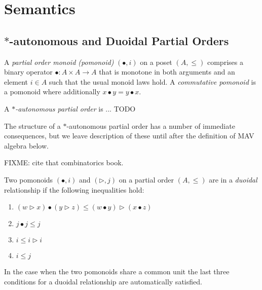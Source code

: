 \section{Semantics}\label{sec:mav-semantics}

\subsection{$*$-autonomous and Duoidal Partial Orders}

\begin{definition}
  A \emph{partial order monoid (pomonoid)} $(\bullet, i)$ on a poset
  $(A, \leq)$ comprises a binary operator $\bullet : A \times A \to A$
  that is monotone in both arguments and an element $i \in A$ such
  that the usual monoid laws hold. A \emph{commutative pomonoid} is a
  pomonoid where additionally $x \bullet y = y \bullet x$.
\end{definition}

\begin{definition}
  A \emph{$*$-autonomous partial order} is ... TODO

  
\end{definition}

\begin{remark}
  The structure of a $*$-autonomous partial order has a number of
  immediate consequences, but we leave description of these until
  after the definition of MAV algebra below. 
\end{remark}

FIXME: cite that combinatorics book.
\begin{definition}
  Two pomonoids $(\bullet, i)$ and $(\rhd, j)$ on a partial order
  $(A, \leq)$ are in a \emph{duoidal} relationship if the following
  inequalities hold:
  \begin{enumerate}
  \item $(w \rhd x) \bullet (y \rhd z) \leq (w \bullet y) \rhd (x \bullet z)$
  \item $j \bullet j \leq j$
  \item $i \leq i \rhd i$
  \item $i \leq j$
  \end{enumerate}
\end{definition}

\begin{remark}
  In the case when the two pomonoids share a common unit the last
  three conditions for a duoidal relationship are automatically
  satisfied.
\end{remark}

